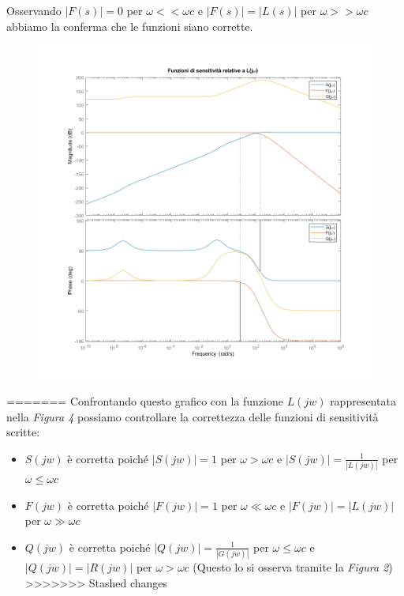\documentclass{article}
\begin{document}
Osservando $|F(s)| = 0$ per $\omega << \omega c $ e  $|F(s)| = |L(s)| $ per $\omega >> \omega c$ abbiamo la conferma che le funzioni siano corrette.
\begin{figure}[!h]
\centering
\includegraphics[width=1\textwidth]{grafici/fig10.png}
\end{figure}

=======
Confrontando questo grafico con la funzione $L(jw)$ rappresentata nella \textit{Figura 4} possiamo controllare la correttezza delle funzioni di sensitività scritte:
\begin{itemize}
\item $S(jw)$ è corretta poiché $|S(jw)| = 1$ per $\omega > \omega c  $ e  $|S(jw)| = \frac{1}{|L(jw)|} $ per $\omega \leq \omega c $
\item $F(jw)$ è corretta poiché $|F(jw)| = 1$ per $\omega \ll \omega c $ e  $|F(jw)| = |L(jw)| $ per $\omega \gg \omega c$
\item $Q(jw)$ è corretta poiché $|Q(jw)| = \frac{1}{|G(jw)|}$ per $\omega \leq \omega c $ e  $|Q(jw)| = |R(jw)| $ per $\omega > \omega c$ (Questo lo si osserva tramite la \textit{Figura 2})
>>>>>>> Stashed changes

\end{itemize}
\end{document}

